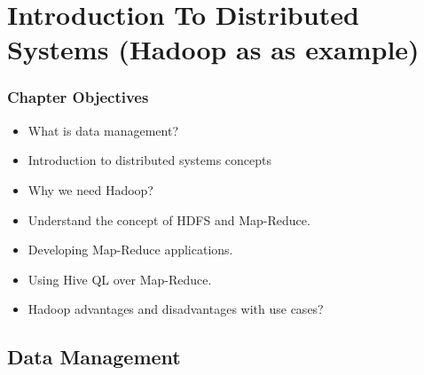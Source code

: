 \section{Introduction To Distributed Systems (Hadoop as as example)}


\begin{frame}
\frametitle{Chapter Objectives}

\begin{itemize}
	\item<1-> What is data management? \pause
	\item<2-> Introduction to distributed systems concepts \pause
	\item<3-> Why we need Hadoop? \pause
	\item<4-> Understand the concept of HDFS and Map-Reduce.
	\item<5-> Developing Map-Reduce applications. \pause
	\item<5-> Using Hive QL over Map-Reduce. \pause
	\item<7-> Hadoop advantages and disadvantages with use cases? \pause
\end{itemize}

\end{frame}


\subsection{Data Management}


